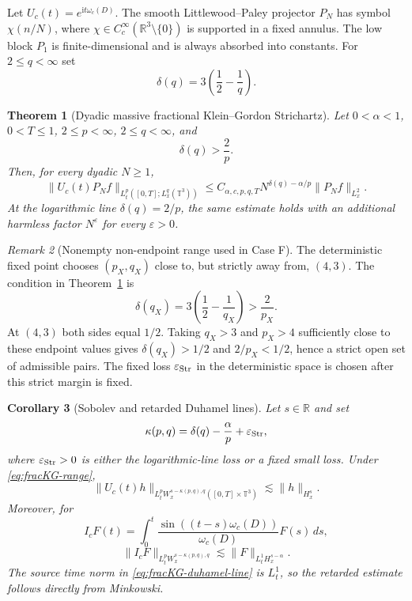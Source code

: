 \documentclass[10pt]{amsart}
\numberwithin{equation}{section}
\theoremstyle{plain}
\newtheorem{theorem}{Theorem}[section]
\newtheorem{corollary}[theorem]{Corollary}
\theoremstyle{definition}
\theoremstyle{remark}
\newtheorem{remark}[theorem]{Remark}
\newcommand{\eps}{\varepsilon}
\newcommand{\ii}{\mathrm{i}}
\begin{document}
Let $U_c(t)=e^{\ii t\omega_c(D)}$.  The smooth Littlewood--Paley projector $P_N$ has symbol $\chi(n/N)$, where $\chi\in C_c^\infty(\mathbb R^3\setminus\{0\})$ is supported in a fixed annulus.  The low block $P_1$ is finite-dimensional and is always absorbed into constants.  For $2\le q<\infty$ set
\[
        \delta(q)=3\left(\frac12-\frac1q\right).
\]

\begin{theorem}[Dyadic massive fractional Klein--Gordon Strichartz]\label{thm:fracKG-dyadic}
Let $0<\alpha<1$, $0<T\le1$, $2\le p<\infty$, $2\le q<\infty$, and
\begin{equation}\label{eq:fracKG-range}
        \delta(q)>\frac2p.
\end{equation}
Then, for every dyadic $N\ge1$,
\begin{equation}\label{eq:fracKG-dyadic-main}
        \|U_c(t)P_Nf\|_{L_t^p([0,T];L_x^q(\mathbb T^3))}
        \le C_{\alpha,c,p,q,T}
        N^{\delta(q)-\alpha/p}\|P_Nf\|_{L_x^2}.
\end{equation}
At the logarithmic line $\delta(q)=2/p$, the same estimate holds with an additional harmless factor $N^\eps$ for every $\eps>0$.
\end{theorem}

\begin{remark}[Nonempty non-endpoint range used in Case F]\label{rem:fracKG-nonempty-range}
The deterministic fixed point chooses $(p_X,q_X)$ close to, but strictly away from, $(4,3)$.  The condition in Theorem~\ref{thm:fracKG-dyadic} is
\[
        \delta(q_X)=3\left(\frac12-\frac1{q_X}\right)>\frac2{p_X}.
\]
At $(4,3)$ both sides equal $1/2$.  Taking $q_X>3$ and $p_X>4$ sufficiently close to these endpoint values gives $\delta(q_X)>1/2$ and $2/p_X<1/2$, hence a strict open set of admissible pairs.  The fixed loss $\varepsilon_{\rm Str}$ in the deterministic space is chosen after this strict margin is fixed.
\end{remark}

\begin{corollary}[Sobolev and retarded Duhamel lines]\label{cor:fracKG-semigroup-duhamel}
Let $s\in\mathbb R$ and set
\[
        \kappa(p,q)=\delta(q)-\frac{\alpha}{p}+\varepsilon_{\rm Str},
\]
where $\varepsilon_{\rm Str}>0$ is either the logarithmic-line loss or a fixed small loss.  Under \eqref{eq:fracKG-range},
\begin{equation}\label{eq:fracKG-sob-line}
        \|U_c(t)h\|_{L_t^pW_x^{s-\kappa(p,q),q}([0,T]\times\mathbb T^3)}
        \lesssim \|h\|_{H_x^s}.
\end{equation}
Moreover, for
\[
        I_cF(t)=\int_0^t\frac{\sin((t-s)\omega_c(D))}{\omega_c(D)}F(s)\,ds,
\]
\begin{equation}\label{eq:fracKG-duhamel-line}
        \|I_cF\|_{L_t^pW_x^{s-\kappa(p,q),q}}
        \lesssim \|F\|_{L_t^1H_x^{s-\alpha}}.
\end{equation}
The source time norm in \eqref{eq:fracKG-duhamel-line} is $L_t^1$, so the retarded estimate follows directly from Minkowski.
\end{corollary}
\end{document}
